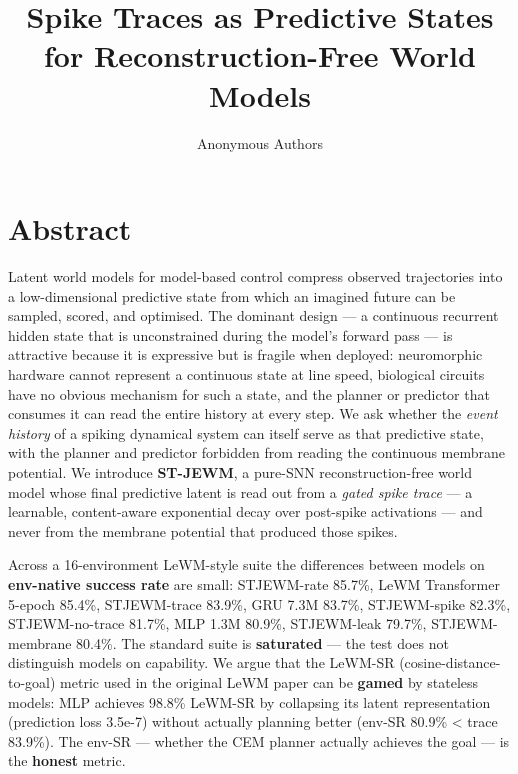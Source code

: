 \documentclass{article}
\title{Spike Traces as Predictive States for Reconstruction-Free World Models}
\author{Anonymous Authors}
\date{}
\begin{document}
\maketitle

\section*{Abstract}

Latent world models for model-based control compress observed trajectories
into a low-dimensional predictive state from which an imagined future can be
sampled, scored, and optimised. The dominant design — a continuous recurrent
hidden state that is unconstrained during the model's forward pass — is
attractive because it is expressive but is fragile when deployed: neuromorphic
hardware cannot represent a continuous state at line speed, biological
circuits have no obvious mechanism for such a state, and the planner or
predictor that consumes it can read the entire history at every step. We
ask whether the \emph{event history} of a spiking dynamical system can itself
serve as that predictive state, with the planner and predictor forbidden
from reading the continuous membrane potential. We introduce \textbf{ST-JEWM},
a pure-SNN reconstruction-free world model whose final predictive latent
is read out from a \emph{gated spike trace} — a learnable, content-aware
exponential decay over post-spike activations — and never from the
membrane potential that produced those spikes.

Across a 16-environment LeWM-style suite the differences between models
on \textbf{env-native success rate} are small: STJEWM-rate 85.7\%, LeWM
Transformer 5-epoch 85.4\%, STJEWM-trace 83.9\%, GRU 7.3M 83.7\%, STJEWM-spike
82.3\%, STJEWM-no-trace 81.7\%, MLP 1.3M 80.9\%, STJEWM-leak 79.7\%, STJEWM-membrane
80.4\%. The standard suite is \textbf{saturated} — the test does not distinguish
models on capability. We argue that the LeWM-SR (cosine-distance-to-goal)
metric used in the original LeWM paper can be \textbf{gamed} by stateless models:
MLP achieves 98.8\% LeWM-SR by collapsing its latent representation
(prediction loss 3.5e-7) without actually planning better (env-SR 80.9\% < trace
83.9\%). The env-SR — whether the CEM planner actually achieves the goal —
is the \textbf{honest} metric.
\end{document}
